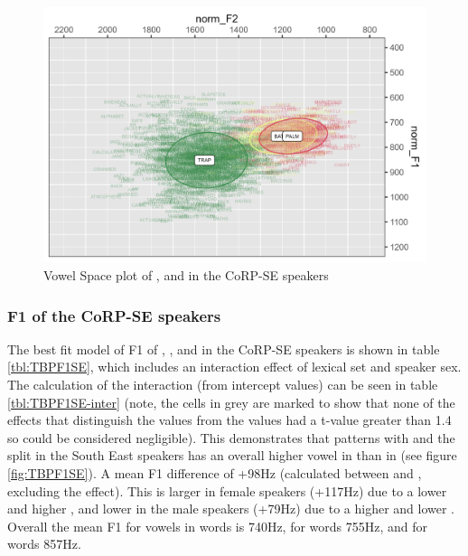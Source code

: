 \documentclass[../../00.FullDoc/tex/Thesis]{subfiles}
\begin{document}
\begin{figure}[h]
	\includegraphics[width=\textwidth]{../figures/TBP-SE-vplot.png}
	\caption{Vowel Space plot of \trap{},\bath{} and \palm{} in the CoRP-SE speakers} \label{fig:TBPvplotSE}
\end{figure}


\subsubsection{F1 of the CoRP-SE speakers}
The best fit model of F1 of \trap{}, \bath{}, and \palm{} in the CoRP-SE speakers is shown in table \ref{tbl:TBPF1SE}, which includes an interaction effect of lexical set and speaker sex. The calculation of the interaction (from intercept values) can be seen in table \ref{tbl:TBPF1SE-inter} (note, the cells in grey are marked to show that none of the effects that distinguish the \palm{} values from the \bath{} values had a t-value greater than 1.4 so could be considered negligible). This demonstrates that \bath{} patterns with \palm{} and the \TB{} split in the South East speakers has an overall higher vowel in \trap{} than in \bath{} (see figure \ref{fig:TBPF1SE}). A mean F1 difference of +98Hz (calculated between \bath{} and \trap{}, excluding the \palm{} effect). This is larger in female speakers (+117Hz) due to a lower \bath{} and higher \trap{}, and lower in the male speakers (+79Hz) due to a higher \bath{} and lower \trap{}. Overall the mean F1 for vowels in \bath{} words is 740Hz, for \palm{} words 755Hz, and for \trap{} words 857Hz.

\end{document}
